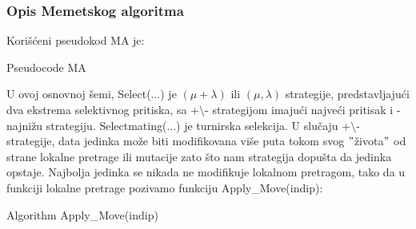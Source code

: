 \documentclass[a4paper]{article}
\begin{document}
\subsubsection{Opis Memetskog algoritma }
\label{subsec:MA}

Korišćeni pseudokod MA je: \\

\begin{minipage}{0.9\linewidth}%
\begin{algorithm}[H]
\SetAlgoLined
{}
\caption{Pseudocode MA}
\end{algorithm}
\end{minipage}

\verb||

U ovoj osnovnoj šemi, Select(...) je $(\mu + \lambda)$ ili $(\mu,\lambda)$ strategije, predstavljajući dva ekstrema selektivnog pritiska, sa +$\setminus$- strategijom imajući najveći pritisak i - najnižu strategiju. Select\textunderscore mating(...) je turnirska selekcija. U slučaju +$\setminus$- strategije, data jedinka može biti modifikovana više puta tokom svog $"$života$"$ od strane lokalne pretrage ili mutacije zato što nam strategija dopušta da jedinka opstaje. Najbolja jedinka se nikada ne modifikuje lokalnom pretragom, tako da u funkciji lokalne pretrage pozivamo funkciju Apply\_Move(indip):\\


\begin{minipage}{0.9\linewidth}%
\begin{algorithm}[H]
\SetAlgoLined
{}
\caption{Algorithm Apply\_Move(indip)}
\end{algorithm}
\end{minipage}

\verb||
\end{document}
